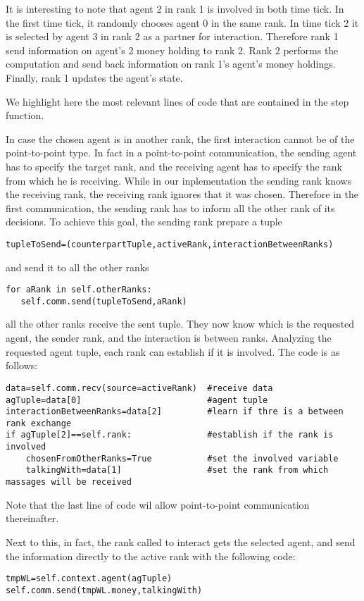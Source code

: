 \documentclass{article}
\begin{document}
It is interesting to note that agent 2 in rank 1 is involved in both time tick.
In the first time tick, it randomly chooses agent 0 in the same rank.
In time tick 2 it is selected by agent 3 in rank 2 as a partner for interaction. Therefore rank 1 send information on agent's 2 money holding to rank 2.
Rank 2 performs the computation and send back information on rank 1's agent's money holdings. Finally, rank 1 updates the agent's state.

We highlight here the most relevant lines of code that are contained in the step function.  

In case the chosen agent is in another rank, the first interaction cannot be of the point-to-point type. In fact in a point-to-point communication, the sending agent has to specify the target rank, and the receiving agent has to specify the rank from which he is receiving. While in our inplementation the sending rank knows the receiving rank, the receiving rank ignores that it was chosen. Therefore in the first communication, the sending rank has to inform all the other rank of its decisions. To achieve this goal, the sending rank prepare a tuple 
\begin{verbatim}
tupleToSend=(counterpartTuple,activeRank,interactionBetweenRanks)
\end{verbatim}
and send it to all the other ranks
\begin{verbatim}
for aRank in self.otherRanks:
   self.comm.send(tupleToSend,aRank)
\end{verbatim}
all the other ranks receive the sent tuple. They now know which is the requested agent, the sender rank, and the interaction is between ranks.
Analyzing the requested agent tuple, each rank can establish if it is involved. The code is as follows:
\begin{verbatim}
data=self.comm.recv(source=activeRank)  #receive data
agTuple=data[0]                         #agent tuple
interactionBetweenRanks=data[2]         #learn if thre is a between rank exchange
if agTuple[2]==self.rank:               #establish if the rank is involved
    chosenFromOtherRanks=True           #set the involved variable
    talkingWith=data[1]                 #set the rank from which massages will be received
\end{verbatim}
Note that the last line of code wil allow point-to-point communication thereinafter.

Next to this, in fact, the rank called to interact gets the selected agent, and send the information directly to the active rank with the following code:
\begin{verbatim}
tmpWL=self.context.agent(agTuple)
self.comm.send(tmpWL.money,talkingWith)
\end{verbatim}             
\end{document}
